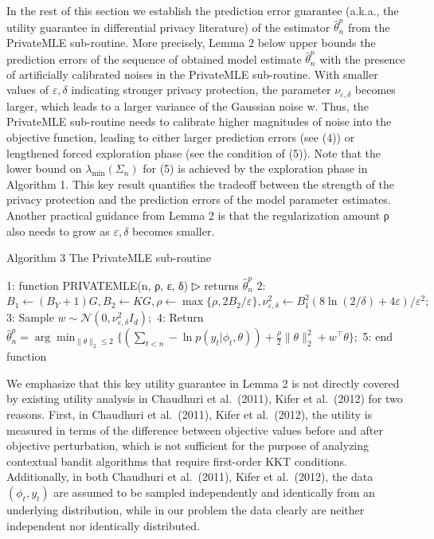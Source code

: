 In the rest of this section we establish the prediction error guarantee (a.k.a., the utility guarantee in differential privacy literature) of the estimator \(\widehat { \theta } _ { n } ^ { p }\) from the PrivateMLE sub-routine. More precisely, Lemma 2 below upper bounds the prediction errors of the sequence of obtained model estimate \(\widehat { \theta } _ { n } ^ { p }\) with the presence of artificially calibrated noises in the PrivateMLE sub-routine. With smaller values of \(\varepsilon , \delta\) indicating stronger privacy protection, the parameter \(\nu _ { \varepsilon , \delta }\) becomes larger, which leads to a larger variance of the Gaussian noise w. Thus, the PrivateMLE sub-routine needs to calibrate higher magnitudes of noise into the objective function, leading to either larger prediction errors (see (4)) or lengthened forced exploration phase (see the condition of (5)). Note that the lower bound on \(\lambda _ { \operatorname* { m i n } } ( \Sigma _ { n } )\) for (5) is achieved by the exploration phase in Algorithm 1. This key result quantifies the tradeoff between the strength of the privacy protection and the prediction errors of the model parameter estimates. Another practical guidance from Lemma 2 is that the regularization amount ρ also needs to grow as \(\varepsilon , \delta\) becomes smaller.

Algorithm 3 The PrivateMLE sub-routine

1: function PRIVATEMLE(n, ρ, ε, δ) ▷ returns \(\widehat{\theta}_{n}^{p}\) 
2: \(B_{1} \leftarrow (B_{Y} + 1)G, B_{2} \leftarrow KG, \rho \leftarrow \max\{\rho, 2B_{2}/\varepsilon\}, \nu_{\varepsilon,\delta}^{2} \leftarrow B_{1}^{2}(8\ln(2/\delta) + 4\varepsilon)/\varepsilon^{2};\) 
3: Sample \(w \sim \mathcal{N}(0, \nu_{\varepsilon,\delta}^{2} I_{d});\) 
4: Return \(\widehat{\theta}_{n}^{p} = \arg\min_{\|\theta\|_{2} \leq 2}\{(\sum_{t < n} - \ln p(y_{t}|\phi_{t}, \theta)) + \frac{\rho}{2}\|\theta\|_{2}^{2} + w^{\top}\theta\};\) 
5: end function

We emphasize that this key utility guarantee in Lemma 2 is not directly covered by existing utility analysis in Chaudhuri et al.~(2011), Kifer et al.~(2012) for two reasons. First, in Chaudhuri et al.~(2011), Kifer et al.~(2012), the utility is measured in terms of the difference between objective values before and after objective perturbation, which is not sufficient for the purpose of analyzing contextual bandit algorithms that require first-order KKT conditions. Additionally, in both Chaudhuri et al.~(2011), Kifer et al.~(2012), the data \(\left( \phi _ { t } , y _ { t } \right)\) are assumed to be sampled independently and identically from an underlying distribution, while in our problem the data clearly are neither independent nor identically distributed.

